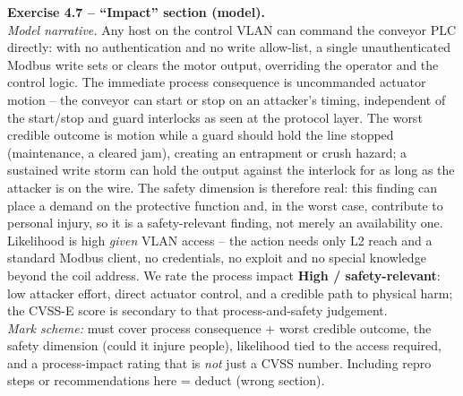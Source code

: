 \documentclass[11pt,a4paper]{article}
\begin{document}
\begin{solutionbox}
\textbf{Exercise 4.7 -- ``Impact'' section (model).}\\[2pt]
\emph{Model narrative.} Any host on the control VLAN can command the conveyor PLC directly: with no
authentication and no write allow-list, a single unauthenticated Modbus write sets or clears the
motor output, overriding the operator and the control logic. The immediate process consequence is
uncommanded actuator motion -- the conveyor can start or stop on an attacker's timing, independent
of the start/stop and guard interlocks as seen at the protocol layer. The worst credible outcome is
motion while a guard should hold the line stopped (maintenance, a cleared jam), creating an
entrapment or crush hazard; a sustained write storm can hold the output against the interlock for as
long as the attacker is on the wire. The safety dimension is therefore real: this finding can place
a demand on the protective function and, in the worst case, contribute to personal injury, so it is
a safety-relevant finding, not merely an availability one. Likelihood is high \emph{given} VLAN
access -- the action needs only L2 reach and a standard Modbus client, no credentials, no exploit
and no special knowledge beyond the coil address. We rate the process impact \textbf{High /
safety-relevant}: low attacker effort, direct actuator control, and a credible path to physical
harm; the CVSS-E score is secondary to that process-and-safety judgement.\\[2pt]
\emph{Mark scheme:} must cover process consequence + worst credible outcome, the safety dimension
(could it injure people), likelihood tied to the access required, and a process-impact rating that
is \emph{not} just a CVSS number. Including repro steps or recommendations here = deduct (wrong
section).
\end{solutionbox}
\end{document}

